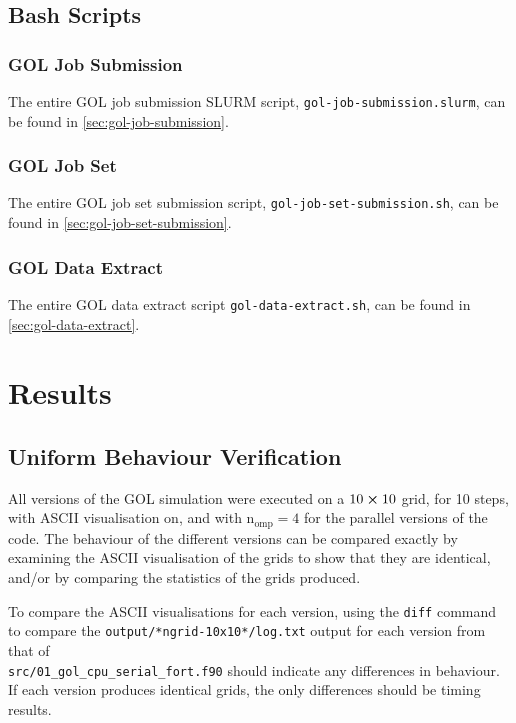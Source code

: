 \documentclass[]{article}
\begin{document}
\subsection{Bash Scripts}
\label{sec:bash-scripts}

\subsubsection{GOL Job Submission}
\label{sec:gol-job}

The entire GOL job submission SLURM script,
\lstinline[style=ff]{gol-job-submission.slurm}, can be found in
\autoref{sec:gol-job-submission}.

\subsubsection{GOL Job Set}
\label{sec:gol-job-set}

The entire GOL job set submission script,
\lstinline[style=ff]{gol-job-set-submission.sh}, can be found in
\autoref{sec:gol-job-set-submission}.

\subsubsection{GOL Data Extract}
\label{sec:gol-data}

The entire GOL data extract script
\lstinline[style=ff]{gol-data-extract.sh}, can be found in
\autoref{sec:gol-data-extract}.

\newpage
\section{Results}
\label{sec:results}

\subsection{Uniform Behaviour Verification}
\label{sec:unif-behav-verif}

All versions of the GOL simulation were executed on a $10 \cross 10$ grid, for
10 steps, with ASCII visualisation on, and with $\mathrm{n_{omp}} = 4$ for the
parallel versions of the code.
The behaviour of the different versions can be compared exactly by examining the
ASCII visualisation of the grids to show that they are identical, and/or by
comparing the statistics of the grids produced.

To compare the ASCII visualisations for each version, using the \lstinline{diff}
command to compare the \lstinline[style=ff]{output/*ngrid-10x10*/log.txt} output
for each version from that of \\
\lstinline[style=ff]{src/01_gol_cpu_serial_fort.f90} should indicate any
differences in behaviour.
If each version produces identical grids, the only differences should be timing
results.
\end{document}

